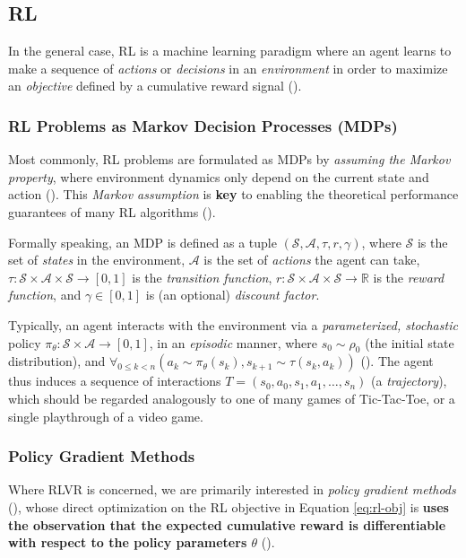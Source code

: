 \documentclass{article} %
\theoremstyle{definition}
\begin{document}
\subsection{RL}

In the general case, RL is a machine learning paradigm
where an agent learns to make a sequence of \textit{actions} or \textit{decisions} 
in an \textit{environment} in order to maximize an \textit{objective} defined by a cumulative reward signal (\cite{Sutton-and-Barto-1998}).

\subsubsection{RL Problems as Markov Decision Processes (MDPs)}

Most commonly, RL problems are formulated as MDPs
by \textit{assuming the Markov property}, where environment dynamics
only depend on the current state and action
(\cite{SpinningUp-2018, Levine-et-al-2023, Sutton-and-Barto-1998}). This \textit{Markov assumption} is \textbf{key} to 
enabling the theoretical performance guarantees of many RL algorithms (\cite{Sutton-and-Barto-1998}).

Formally speaking, an MDP is defined as a tuple $(\mathcal{S}, \mathcal{A}, \tau, r, \gamma)$, 
where $\mathcal{S}$ is the set of \textit{states} in the environment, 
$\mathcal{A}$ is the set of \textit{actions} the agent can take,
$\tau: \mathcal{S} \times \mathcal{A} \times \mathcal{S} \rightarrow [0, 1]$ is the \textit{transition function},
$r: \mathcal{S} \times \mathcal{A} \times \mathcal{S} \rightarrow \mathbb{R}$ is the \textit{reward function}, and 
$\gamma \in [0, 1]$ is (an optional) \textit{discount factor}.

Typically, an agent interacts with the environment 
via a \textit{parameterized, stochastic} policy $\pi_\theta: \mathcal{S} \times \mathcal{A} \rightarrow [0, 1]$,
in an \textit{episodic} manner, where $s_0 \sim \rho_0$ (the initial state distribution),
and $\forall_{0 \leq k < n}\left(a_{k} \sim \pi_\theta(s_k), s_{k+1} \sim \tau(s_k, a_{k})\right)$ (\cite{wk1}). 
The agent thus induces a sequence of interactions $T = (s_0, a_0, s_1, a_1, \ldots, s_n)$
(a \textit{trajectory}), which should be regarded analogously to one
of many games of Tic-Tac-Toe, or a single playthrough of a video game.

\subsubsection{Policy Gradient Methods}
Where RLVR is concerned, we are primarily interested in \textit{policy gradient methods} (\cite{wk2, SpinningUp-2018, Weng-2018}),
whose direct optimization on the RL objective in Equation \eqref{eq:rl-obj} is \textbf{uses the
observation that the expected cumulative reward is differentiable with respect to the policy parameters $\theta$} (\cite{SpinningUp-2018,Levine-et-al-2023,Weng-2018}).
\end{document}
